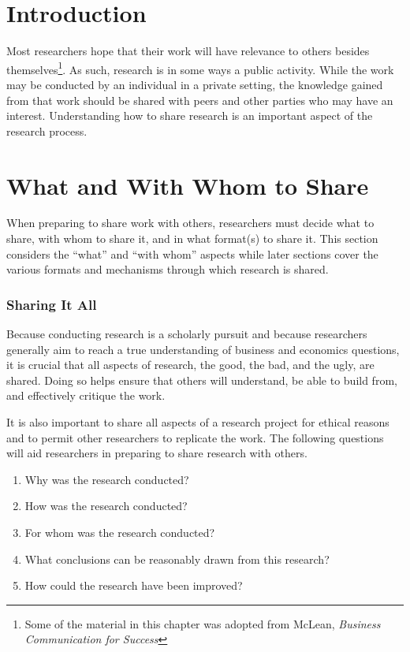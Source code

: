 \section{Introduction}

Most researchers hope that their work will have relevance to others besides themselves\footnote{Some of the material in this chapter was adopted from McLean, \textit{Business Communication for Success}\cite{mclean2012business}}. As such, research is in some ways a public activity. While the work may be conducted by an individual in a private setting, the knowledge gained from that work should be shared with  peers and other parties who may have an interest. Understanding how to share research is an important aspect of the research process.

\section{What and With Whom to Share}

When preparing to share work with others, researchers must decide what to share, with whom to share it, and in what format(s) to share it. This section considers the ``what'' and ``with whom'' aspects while later sections cover the various formats and mechanisms through which research is shared.

\subsubsection{Sharing It All}

Because conducting research is a scholarly pursuit and because researchers generally aim to reach a true understanding of business and economics questions, it is crucial that all aspects of research, the good, the bad, and the ugly, are shared. Doing so helps ensure that others will understand, be able to build from, and effectively critique the work.

It is also important to share all aspects of a research project for ethical reasons and to permit other researchers to replicate the work. The following questions will aid researchers in preparing to share research with others.

\begin{enumerate}
	\item Why was the research conducted?
	\item How was the research conducted?
	\item For whom was the research conducted?
	\item What conclusions can be reasonably drawn from this research?
	\item How could the research have been improved?
\end{enumerate}

